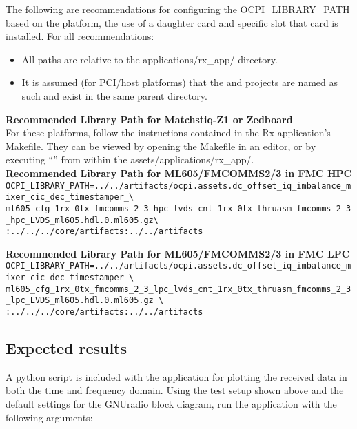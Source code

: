 \noindent The following are recommendations for configuring the OCPI\_LIBRARY\_PATH based on the platform, the use of a daughter card and specific slot that card is installed. For all recommendations:
\begin{itemize}
  \item All paths are relative to the applications/rx\_app/ directory.
  \item It is assumed (for PCI/host platforms) that the  and  projects are named as such and exist in the same parent directory.\\
\end{itemize}

\noindent\textbf{Recommended Library Path for Matchstiq-Z1 or Zedboard}\\

\noindent
For these platforms, follow the instructions contained in the Rx application's Makefile. They can be viewed by opening the Makefile in an editor, or by executing ``'' from within the assets/applications/rx\_app/.
\\

\newpage
\noindent\textbf{Recommended Library Path for ML605/FMCOMMS2/3 in FMC HPC}\\

\noindent
\verb|OCPI_LIBRARY_PATH=../../artifacts/ocpi.assets.dc_offset_iq_imbalance_mixer_cic_dec_timestamper_\| \\
\verb|ml605_cfg_1rx_0tx_fmcomms_2_3_hpc_lvds_cnt_1rx_0tx_thruasm_fmcomms_2_3_hpc_LVDS_ml605.hdl.0.ml605.gz\| \\
\verb|:../../../core/artifacts:../../artifacts| \\
\par\medskip

\noindent\textbf{Recommended Library Path for ML605/FMCOMMS2/3 in FMC LPC}\\

\noindent
\verb|OCPI_LIBRARY_PATH=../../artifacts/ocpi.assets.dc_offset_iq_imbalance_mixer_cic_dec_timestamper_\| \\
\verb|ml605_cfg_1rx_0tx_fmcomms_2_3_lpc_lvds_cnt_1rx_0tx_thruasm_fmcomms_2_3_lpc_LVDS_ml605.hdl.0.ml605.gz \| \\
\verb|:../../../core/artifacts:../../artifacts| \\
\par\medskip




\pagebreak
\subsection{Expected results}
\noindent A python script is included with the application for plotting the received data in both the time and frequency domain. Using the test setup shown above and the default settings for the GNUradio block diagram, run the application with the following arguments:\par\medskip

